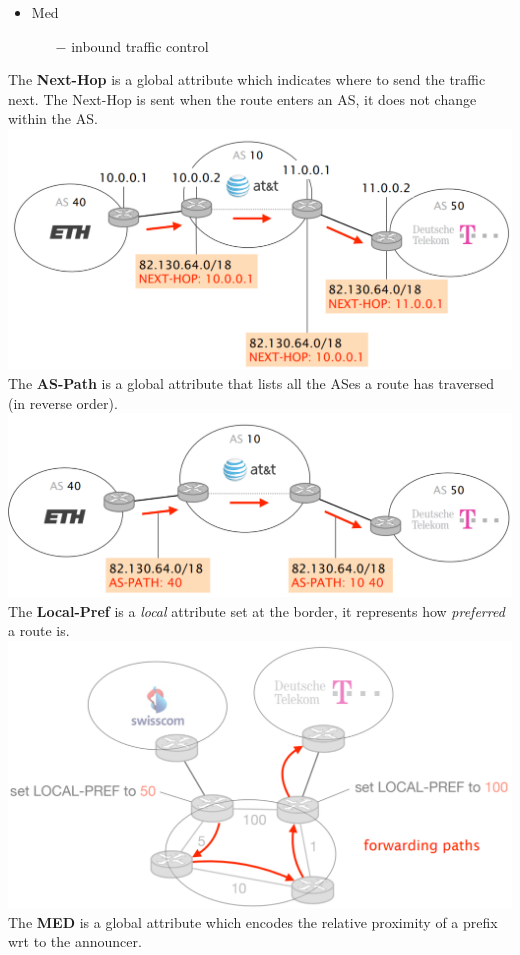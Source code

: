 \documentclass[a4paper, fontsize=8pt, landscape, DIV=1]{scrartcl}
\begin{document}
\begin{multicols*}{4}
\begin{itemize}[noitemsep]
			\item Med
			\begin{itemize}
				\item[$-$] inbound traffic control
			\end{itemize}
		\end{itemize}
		The \textbf{Next-Hop} is a global attribute which indicates where to send the traffic next. The Next-Hop is sent when the route enters an AS, it does not change within the AS.\\
		\includegraphics[width=\columnwidth]{images/Network_Layer/next_hop.png}
		The \textbf{AS-Path} is a global attribute that lists all the ASes a route has traversed (in reverse order).\\
		\includegraphics[width=\columnwidth]{images/Network_Layer/as_path.png}
		The \textbf{Local-Pref} is a \textit{local} attribute set at the border, it represents how \textit{preferred} a route is.\\
		\includegraphics[width=\columnwidth]{images/Network_Layer/local_pref.png}
		The \textbf{MED} is a global attribute which encodes the relative proximity of a prefix wrt to the announcer.\\

		 
			
		\end{multicols*}
	\setcounter{secnumdepth}{3}
\end{document}

